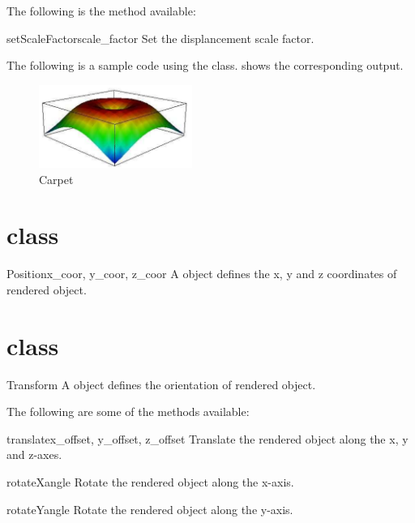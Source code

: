 The following is the method available:
\begin{methoddesc}[Carpet]{setScaleFactor}{scale_factor}
Set the displancement scale factor.
\end{methoddesc}

The following is a sample code using the \Carpet class.
 shows the corresponding output.


\begin{figure}[ht]
\begin{center}
\includegraphics[width=50mm]{figures/Carpet}
\end{center}
\caption{Carpet}
\label{fig:carpet.1}
\end{figure}


\section{\Position class}
\begin{classdesc}{Position}{x_coor, y_coor, z_coor}
A \Position object defines the x, y and z coordinates of rendered object.
\end{classdesc}

\section{\Transform class}
\begin{classdesc}{Transform}{}
A \Transform object defines the orientation of rendered object.
\end{classdesc}

The following are some of the methods available:
\begin{methoddesc}[Transform]{translate}{x_offset, y_offset, z_offset}
Translate the rendered object along the x, y and z-axes.
\end{methoddesc}

\begin{methoddesc}[Transform]{rotateX}{angle}
Rotate the rendered object along the x-axis.
\end{methoddesc}

\begin{methoddesc}[Transform]{rotateY}{angle}
Rotate the rendered object along the y-axis.
\end{methoddesc}

